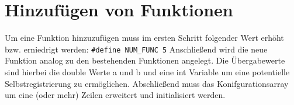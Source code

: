\section{Hinzufügen von Funktionen}
Um eine Funktion hinzuzufügen muss im ersten Schritt folgender Wert erhöht bzw. erniedrigt werden:
\newline\texttt{#define NUM_FUNC 5}
\newline
Anschließend wird die neue Funktion analog zu den bestehenden Funktionen angelegt. Die Übergabewerte sind hierbei die double Werte a und b und eine int Variable um eine potentielle Selbstregistrierung zu ermöglichen.
Abschließend muss das Konifgurationsarray um eine (oder mehr) Zeilen erweitert und initialisiert werden. 